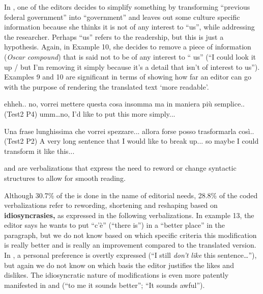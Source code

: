\documentclass[output=paper]{LSP/langsci}
\begin{document}
In , one of the editors decides to simplify something by transforming ``previous federal government'' into ``government'' and leaves out some culture specific information because she thinks it is not of any interest to ``us'', while addressing the researcher. Perhaps ``us'' refers to the  readership, but this is just a hypothesis. Again, in Example 10, she decides to remove a piece of information (\textit{Oscar compound}) that is said not to be of any interest to ``%
us'' (``I could look it up / but I'm removing it simply because it's a detail that isn't of interest to us''). Examples 9 and 10 are significant in terms of showing how far an editor can go with the purpose of rendering the translated text `more readable'.

\ea \label{troqe-marchan:ex:11} 
\glt ehheh.. no, vorrei mettere questa cosa insomma ma in maniera più semplice.. (Test2 P4)
\glt umm\ldots  no, I'd like to put this more simply...
\z 


\ea \label{troqe-marchan:ex:12} 
\glt Una frase lunghissima che vorrei spezzare... allora forse posso trasformarla così.. (Test2 P2)
\glt A very long sentence that I would like to break up... so maybe I could transform it like this...
\z

 and  are verbalizations that express the need to reword or change syntactic structures to allow for smooth reading. 

Although 30.7\% of the  is done in the name of editorial needs, 28.8\% of the coded verbalizations refer to rewording, shortening and reshaping based on \textbf{idiosyncrasies,} as expressed in the following verbalizations. In example 13, the editor says he wants to put ``c'è'' (``there is'') in a ``better place'' in the paragraph, but we do not know based on which specific criteria this modification is really better and is really an improvement compared to the translated version. In , a personal preference is overtly expressed (``I still \textit{don't like} this sentence\ldots ''), but again we do not know on which basis the editor justifies the likes and dislikes. The idiosyncratic nature of modifications is even more patently manifested in  and  (``to me it sounds better''; ``It sounds awful''). 
\end{document}
